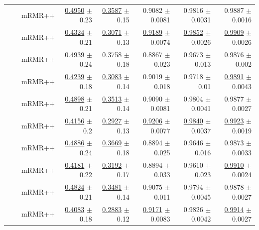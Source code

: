 \begin{longtable}{llp{}rrrrr}
 &  & mRMR++ & \underline{0.4950} {\scriptsize $\pm$ 0.23} & \underline{0.3587} {\scriptsize $\pm$ 0.15} & 0.9082 {\scriptsize $\pm$ 0.0081} & 0.9816 {\scriptsize $\pm$ 0.0031} & 0.9887 {\scriptsize $\pm$ 0.0016} \\
 &  & mRMR++ & \underline{0.4324} {\scriptsize $\pm$ 0.21} & \underline{0.3071} {\scriptsize $\pm$ 0.13} & \underline{0.9189} {\scriptsize $\pm$ 0.0074} & \underline{0.9852} {\scriptsize $\pm$ 0.0026} & \underline{0.9909} {\scriptsize $\pm$ 0.0026} \\
 &  & mRMR++ & \underline{0.4939} {\scriptsize $\pm$ 0.24} & \underline{0.3758} {\scriptsize $\pm$ 0.18} & 0.8867 {\scriptsize $\pm$ 0.023} & 0.9673 {\scriptsize $\pm$ 0.013} & 0.9876 {\scriptsize $\pm$ 0.002} \\
 &  & mRMR++ & \underline{0.4239} {\scriptsize $\pm$ 0.18} & \underline{0.3083} {\scriptsize $\pm$ 0.14} & 0.9019 {\scriptsize $\pm$ 0.018} & 0.9718 {\scriptsize $\pm$ 0.01} & \underline{0.9891} {\scriptsize $\pm$ 0.0043} \\
 &  & mRMR++ & \underline{0.4898} {\scriptsize $\pm$ 0.21} & \underline{0.3513} {\scriptsize $\pm$ 0.14} & 0.9090 {\scriptsize $\pm$ 0.0081} & 0.9804 {\scriptsize $\pm$ 0.0041} & 0.9877 {\scriptsize $\pm$ 0.0027} \\
 &  & mRMR++ & \underline{0.4156} {\scriptsize $\pm$ 0.2} & \underline{0.2927} {\scriptsize $\pm$ 0.13} & \underline{0.9206} {\scriptsize $\pm$ 0.0077} & \underline{0.9840} {\scriptsize $\pm$ 0.0037} & \underline{0.9923} {\scriptsize $\pm$ 0.0019} \\
 &  & mRMR++ & \underline{0.4886} {\scriptsize $\pm$ 0.24} & \underline{0.3669} {\scriptsize $\pm$ 0.18} & 0.8894 {\scriptsize $\pm$ 0.025} & 0.9646 {\scriptsize $\pm$ 0.016} & 0.9873 {\scriptsize $\pm$ 0.0033} \\
 &  & mRMR++ & \underline{0.4181} {\scriptsize $\pm$ 0.22} & \underline{0.3192} {\scriptsize $\pm$ 0.17} & 0.8894 {\scriptsize $\pm$ 0.033} & 0.9610 {\scriptsize $\pm$ 0.023} & \underline{0.9910} {\scriptsize $\pm$ 0.0024} \\
 &  & mRMR++ & \underline{0.4824} {\scriptsize $\pm$ 0.21} & \underline{0.3481} {\scriptsize $\pm$ 0.14} & 0.9075 {\scriptsize $\pm$ 0.011} & 0.9794 {\scriptsize $\pm$ 0.0045} & 0.9878 {\scriptsize $\pm$ 0.0027} \\
 &  & mRMR++ & \underline{0.4083} {\scriptsize $\pm$ 0.18} & \underline{0.2883} {\scriptsize $\pm$ 0.12} & \underline{0.9171} {\scriptsize $\pm$ 0.0083} & 0.9826 {\scriptsize $\pm$ 0.0042} & \underline{0.9914} {\scriptsize $\pm$ 0.0027} \\

\end{longtable}
